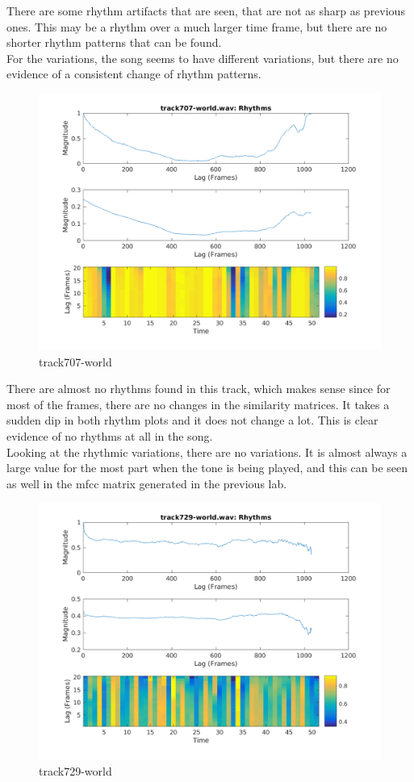 \documentclass[11pt, a4paper]{article}
\begin{document}
There are some rhythm artifacts that are seen, that are not as sharp as previous ones. This may be a rhythm over a much larger time frame, but there are no shorter rhythm patterns that can be found. \\

For the variations, the song seems to have different variations, but there are no evidence of a consistent change of rhythm patterns. 


\begin{figure}[H]
    \centering
    \includegraphics[width=.8\textwidth]{track707-world-Rhythm.png}
    \caption{track707-world}
\end{figure}

There are almost no rhythms found in this track, which makes sense since for most of the frames, there are no changes in the similarity matrices. It takes a sudden dip in both rhythm plots and it does not change a lot. This is clear evidence of no rhythms at all in the song. \\

Looking at the rhythmic variations, there are no variations. It is almost always a large value for the most part when the tone is being played, and this can be seen as well in the mfcc matrix generated in the previous lab. 

\begin{figure}[H]
    \centering
    \includegraphics[width=.8\textwidth]{track729-world-Rhythm.png}
    \caption{track729-world}

\end{figure}
\end{document}
